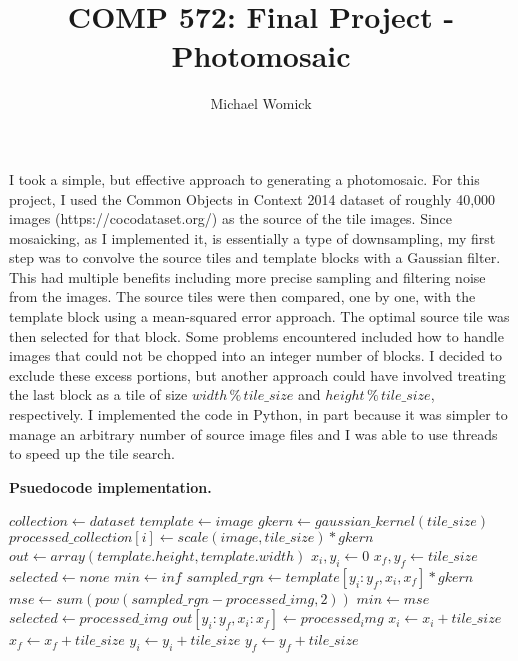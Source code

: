 \documentclass{article}
\title{COMP 572: Final Project - Photomosaic}
\author{Michael Womick}
\begin{document}
\maketitle

I took a simple, but effective approach to generating a photomosaic. For this project, I used the Common Objects in Context 2014 dataset of roughly 40,000 images (https://cocodataset.org/) as the source of the tile images. Since mosaicking, as I implemented it, is essentially a type of downsampling, my first step was to convolve the source tiles and template blocks with a Gaussian filter. This had multiple benefits including more precise sampling and filtering noise from the images. The source tiles were then compared, one by one, with the template block using a mean-squared error approach. The optimal source tile was then selected for that block. Some problems encountered included how to handle images that could not be chopped into an integer number of blocks. I decided to exclude these excess portions, but another approach could have involved treating the last block as a tile of size $width\,\%\,tile\_size$ and $height\,\%\,tile\_size$, respectively. I implemented the code in Python, in part because it was simpler to manage an arbitrary number of source image files and I was able to use threads to speed up the tile search.
\vspace{\baselineskip}

\textbf{Psuedocode implementation.}

\begin{algorithmic}
\STATE $collection\gets dataset$
\STATE $template\gets image$
\STATE $gkern\gets gaussian\_kernel(tile\_size)$
  \STATE $processed\_collection[i]\gets scale(image, tile\_size) * gkern$
\ENDFOR
\STATE $out\gets array(template.height,template.width)$
\STATE $x_i, y_i\gets 0$
\STATE $x_f, y_f\gets tile\_size$
    \STATE $selected\gets none$
    \STATE $min\gets inf$
       \STATE $sampled\_rgn\gets template[y_i:y_f, x_i,x_f] * gkern$
       \STATE $mse\gets sum(pow(sampled\_rgn-processed\_img, 2))$
         \STATE $min\gets mse$
         \STATE $selected\gets processed\_img$
       \ENDIF
    \ENDFOR
  \STATE $out[y_i:y_f, x_i:x_f]\gets processed_img$
  \STATE $x_i \gets x_i + tile\_size$
  \STATE $x_f \gets x_f + tile\_size$
  \ENDFOR
\STATE $y_i \gets y_i + tile\_size$
\STATE $y_f \gets y_f + tile\_size$
\ENDFOR
\end{algorithmic}
\end{document}
